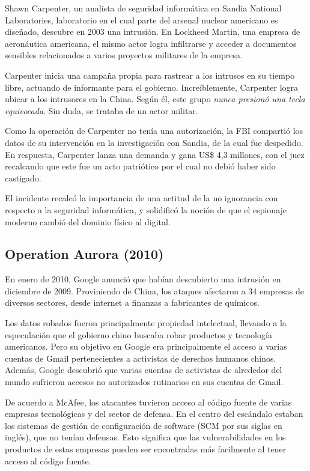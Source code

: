 \documentclass{article}
\begin{document}
Shawn Carpenter, un analista de seguridad informática en Sandia National Laboratories, laboratorio en el cual parte del arsenal nuclear americano es diseñado, descubre en 2003 una intrusión. En Lockheed Martin, una empresa de aeronáutica americana, el mismo actor logra infiltrarse y acceder a documentos sensibles relacionados a varios proyectos militares de la empresa.

Carpenter inicia una campaña propia para rastrear a los intrusos en su tiempo libre, actuando de informante para el gobierno. Increíblemente, Carpenter logra ubicar a los intrusores en la China. Según él, este grupo {\it nunca presionó una tecla equivocada}. Sin duda, se trataba de un actor militar.\autocite{time-titan-rain} \autocite{homelandsecurity-titan-rain}

Como la operación de Carpenter no tenía una autorización, la FBI compartió los datos de su intervención en la investigación con Sandia, de la cual fue despedido. En respuesta, Carpenter lanza una demanda y gana US\$ 4,3 millones, con el juez recalcando que este fue un acto patriótico por el cual no debió haber sido castigado.

El incidente recalcó la importancia de una actitud de la no ignorancia con respecto a la seguridad informática, y solidificó la noción de que el espionaje moderno cambió del dominio físico al digital. \autocite{computerworld-titan-rain}

\subsection{Operation Aurora (2010)}
En enero de 2010, Google anunció que habían descubierto una intrusión en diciembre de 2009. Proviniendo de China, los ataques afectaron a 34 empresas de diversos sectores, desde internet a finanzas a fabricantes de químicos. 

Los datos robados fueron principalmente propiedad intelectual, llevando a la especulación que el gobierno chino buscaba robar productos y tecnología americanos. Pero su objetivo en Google era principalmente el acceso a varias cuentas de Gmail pertenecientes a activistas de derechos humanos chinos. Además, Google descubrió que varias cuentas de activistas de alrededor del mundo sufrieron accesos no autorizados rutinarios en sus cuentas de Gmail. \autocite{google-aurora}

De acuerdo a McAfee, los atacantes tuvieron acceso al código fuente de varias empresas tecnológicas y del sector de defensa. En el centro del escándalo estaban los sistemas de gestión de configuración de software (SCM por sus siglas en inglés), que no tenían defensas. Esto significa que las vulnerabilidades en los productos de estas empresas pueden ser encontradas más facilmente al tener acceso al código fuente. \autocite{wired-aurora}
\end{document}
